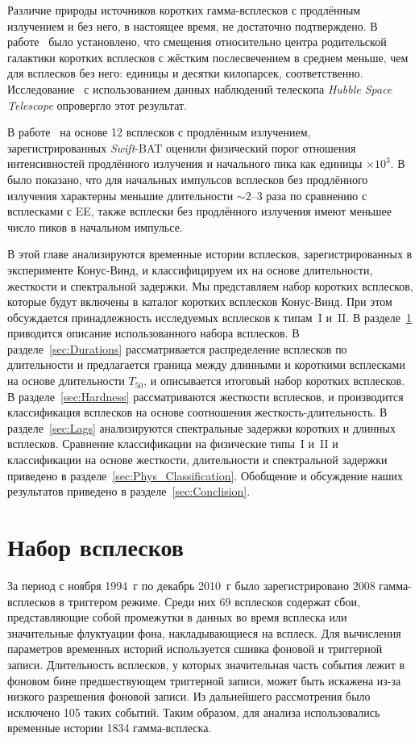 Различие природы источников коротких гамма-всплесков с продлённым излучением и 
без него, в настоящее время, не достаточно подтверждено. В работе~\citep{Troja_2008MNRAS} 
было установлено, что смещения относительно центра родительской галактики 
коротких всплесков с жёстким послесвечением в среднем меньше, чем для всплесков без него: 
единицы и десятки килопарсек, соответственно. 
Исследование~\citep{Fong_2010ApJ} с использованием данных наблюдений 
телескопа \textit{Hubble Space Telescope} опровергло этот результат.

В работе~\citep{Norris_2010ApJ} на основе 12 всплесков с продлённым излучением, зарегистрированных 
\textit{Swift}-BAT оценили физический порог отношения интенсивностей продлённого излучения 
и начального пика как единицы $\times 10^3$. В~\citep{Norris_2011ApJ} было показано, 
что для начальных импульсов всплесков без продлённого излучения характерны меньшие длительности $\sim 2\textrm{--}3$ 
раза по сравнению с всплесками с EE, также всплески без продлённого излучения 
имеют меньшее число пиков в начальном импульсе.

В этой главе анализируются временные истории всплесков, зарегистрированных в 
эксперименте Конус-Винд, и классифицируем их на основе длительности, жесткости и 
спектральной задержки. Мы представляем набор коротких всплесков, которые будут 
включены в каталог коротких всплесков Конус-Винд. При этом обсуждается принадлежность 
исследуемых всплесков к типам~I и~II. В разделе~\ref{sec:GRB_sample} приводится 
описание использованного набора всплесков. 
В разделе~\ref{sec:Durations} рассматривается распределение всплесков по длительности 
и предлагается граница между длинными и короткими всплесками на основе 
длительности $T_{50}$, и описывается итоговый набор коротких всплесков. 
В разделе~\ref{sec:Hardness} рассматриваются жесткости всплесков, и производится 
классификация всплесков на основе соотношения жесткость-длительность. 
В разделе~\ref{sec:Lags} анализируются спектральные задержки коротких и длинных всплесков. 
Сравнение классификации на физические типы~I и~II и классификации на основе жесткости, 
длительности и спектральной задержки приведено в разделе~\ref{sec:Phys_Classification}. 
Обобщение и обсуждение наших результатов приведено в разделе~\ref{sec:Conclision}.  

\section{Набор всплесков}\label{sec:GRB_sample}
За период с ноября 1994~г по декабрь 2010~г было зарегистрировано 2008 гамма-всплесков 
в триггером режиме. Среди них 69 всплесков содержат сбои, представляющие собой 
промежутки в данных во время всплеска или значительные флуктуации фона, 
накладывающиеся на всплеск. Для вычисления параметров временных историй используется 
сшивка фоновой и триггерной записи. Длительность всплесков, у которых значительная 
часть события лежит в фоновом бине предшествующем триггерной записи, может быть 
искажена из-за низкого разрешения фоновой записи. Из дальнейшего рассмотрения 
было исключено 105 таких событий. Таким образом, для анализа использовались временные 
истории 1834 гамма-всплеска. 

